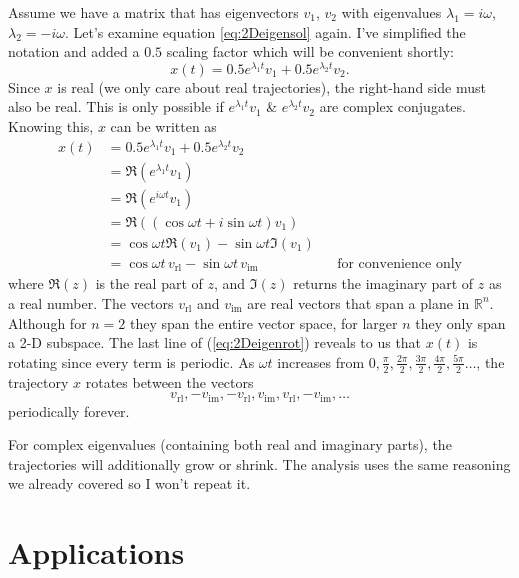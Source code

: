 \documentclass[11pt, oneside]{article}   	%
\begin{document}
Assume we have a matrix that has eigenvectors $v_1$, $v_2$ with eigenvalues $\lambda_1 = i \omega$, $\lambda_2 = -i \omega$.
Let's examine equation \ref*{eq:2Deigensol} again.
I've simplified the notation and added a $0.5$ scaling factor which will be convenient shortly:
\begin{equation}
  x(t) = 0.5 e^{\lambda_1 t}v_1 + 0.5 e^{\lambda_2 t}v_2.
\end{equation}
Since $x$ is real (we only care about real trajectories), the right-hand side must also be real.
This is only possible if $e^{\lambda_1 t}v_{1}$ \& $e^{\lambda_2 t}v_{2}$ are complex conjugates.
Knowing this, $x$ can be written as
\begin{equation} \label{eq:2Deigenrot}
\begin{aligned}
x(t) & = 0.5 e^{\lambda_1 t}v_1 + 0.5 e^{\lambda_2 t}v_2 \\
     & = \Re(e^{\lambda_1 t}v_1) \\
     & = \Re(e^{i\omega t}v_1) \\
     & = \Re((\cos \omega t + i \sin \omega t) v_1) \\
     & = \cos \omega t \Re(v_1) - \sin \omega t \Im(v_1) \\
     & = \cos \omega t \, v_\mathrm{rl} - \sin \omega t \, v_\mathrm{im} && \text{for convenience only}
\end{aligned}
\end{equation}
where $\Re(z)$ is the real part of $z$, and $\Im(z)$ returns the imaginary part of $z$ as a real number.
The vectors $v_\mathrm{rl}$ and $v_\mathrm{im}$ are real vectors that span a plane in $\mathbb{R}^n$.
Although for $n = 2$ they span the entire vector space, for larger $n$ they only span a 2-D subspace.
The last line of (\ref*{eq:2Deigenrot}) reveals to us that $x(t)$ is rotating since every term is periodic.
As $\omega t$ increases from $0,\frac{\pi}{2},\frac{2\pi}{2},\frac{3\pi}{2},\frac{4\pi}{2},\frac{5\pi}{2}\dots$,
the trajectory $x$ rotates between the vectors
$$ v_\mathrm{rl}, -v_\mathrm{im}, -v_\mathrm{rl}, v_\mathrm{im}, v_\mathrm{rl}, -v_\mathrm{im}, \dots $$
periodically forever.

For complex eigenvalues (containing both real and imaginary parts), the trajectories will additionally grow or shrink.
The analysis uses the same reasoning we already covered so I won't repeat it.


\section{Applications}
\end{document}
